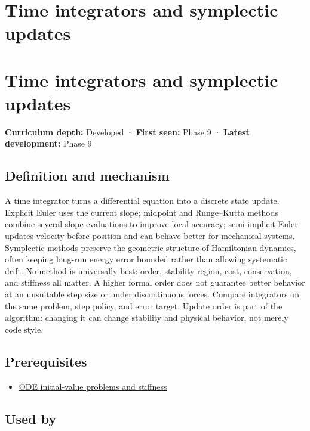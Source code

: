 \hypertarget{appendix-8f96f9c4d5bc}{}
\section*{Time integrators and symplectic updates}
\section{Time integrators and symplectic updates}\label{time-integrators-and-symplectic-updates}

\textbf{Curriculum depth:} Developed · \textbf{First seen:} Phase 9 · \textbf{Latest development:} Phase 9

\subsection{Definition and mechanism}\label{definition-and-mechanism}

A time integrator turns a differential equation into a discrete state update. Explicit Euler uses the current slope; midpoint and Runge--Kutta methods combine several slope evaluations to improve local accuracy; semi-implicit Euler updates velocity before position and can behave better for mechanical systems. Symplectic methods preserve the geometric structure of Hamiltonian dynamics, often keeping long-run energy error bounded rather than allowing systematic drift. No method is universally best: order, stability region, cost, conservation, and stiffness all matter. A higher formal order does not guarantee better behavior at an unsuitable step size or under discontinuous forces. Compare integrators on the same problem, step policy, and error target. Update order is part of the algorithm: changing it can change stability and physical behavior, not merely code style.

\subsection{Prerequisites}\label{prerequisites}

\begin{itemize}
\tightlist
\item
  \hyperref[appendix-e8ab9836882e]{ODE initial-value problems and stiffness}
\end{itemize}

\subsection{Used by}\label{used-by}

